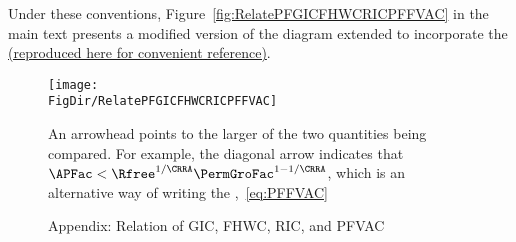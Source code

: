 \documentclass[\econtexRoot/BufferStockTheory]{subfiles}
\begin{document}
Under these conventions, Figure~\ref{fig:RelatePFGICFHWCRICPFFVAC} in the main text presents a modified version of the diagram extended to incorporate the {\PFFVAC} \href{https://econ-ark.github.io/BufferStockTheory/#RelatePFGICFHWCRICPFFVAC}{(reproduced here for convenient reference)}.

\captionsetup[figure]{list=no} %
\begin{figure}[ht]
  \centerline{
    \texttt{[image: \\FigDir/RelatePFGICFHWCRICPFFVAC]}
  }
  \caption{Appendix: Relation of {GIC}, {FHWC}, {RIC}, and {PFVAC}}\label{fig:RelatePFGICFHWCRICPFFVACApp}
  \footnotesize{An arrowhead points to the larger of the two quantities being compared.  For example, the diagonal arrow indicates that $\APFac < \Rfree^{1/\CRRA}\PermGroFac^{1-1/\CRRA}$, which is an alternative way of writing the {\PFFVAC},~\eqref{eq:PFFVAC}}
\end{figure}
\captionsetup[figure]{list=yes} %
\end{document}
